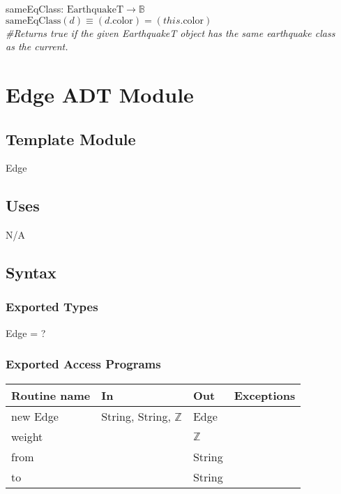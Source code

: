 \documentclass[12pt]{article}
\begin{document}
\noindent sameEqClass: $\mbox{EarthquakeT} \rightarrow \mathbb{B}$\\
$\mbox{sameEqClass}(d) \equiv (d.\mbox{color}) = (this.\mbox{color})$\\
\noindent \textit{\#Returns true if the given EarthquakeT object has the same earthquake class\\
as the current.}


\newpage

\section* {Edge ADT Module}

\subsection* {Template Module}

Edge

\subsection* {Uses}

N/A

\subsection* {Syntax}

\subsubsection* {Exported Types}

Edge = ?


\subsubsection* {Exported Access Programs}

\begin{tabular}{| l | l | l | l |}
\hline
\textbf{Routine name} & \textbf{In} & \textbf{Out} & \textbf{Exceptions}\\
\hline
new Edge & String, String, $\mathbb{Z}$ & Edge & \\
\hline
weight & ~ & $\mathbb{Z}$ & \\
\hline
from & ~ & String & \\
\hline
to & ~ & String & \\
\hline
\end{tabular}
\end{document}

